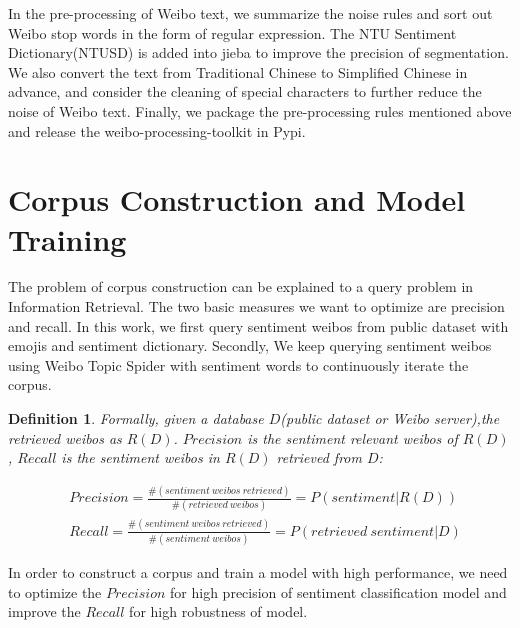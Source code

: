 \documentclass[runningheads]{llncs}
\begin{document}
In the pre-processing of Weibo text, we summarize the noise rules and sort out Weibo stop words in the form of regular expression. The NTU Sentiment Dictionary(NTUSD) \cite{ku2006opinion} is added into jieba to improve the precision of segmentation. We also convert the text from Traditional Chinese to Simplified Chinese in advance, and consider the cleaning of special characters to further reduce the noise of Weibo text. Finally, we package the pre-processing rules mentioned above and release the weibo-processing-toolkit in Pypi. 

\section{Corpus Construction and Model Training}

The problem of corpus construction can be explained to a query problem in Information Retrieval. The two basic measures we want to optimize are precision and recall. In this work, we first query sentiment weibos from public dataset with emojis and sentiment dictionary. Secondly, We keep querying sentiment weibos using Weibo Topic Spider with sentiment words to continuously iterate the corpus.

\newtheorem{myDef}{Definition}

\begin{myDef}
Formally, given a database $D$(public dataset or Weibo server),the retrieved weibos as $R(D)$.  $Precision$ is the sentiment relevant weibos of $R(D)$, $Recall$ is the sentiment weibos in $R(D)$ retrieved from $D$:

\scriptsize{ %
\begin{align}
&Precision = \frac{\#\left ( sentiment\ weibos\ retrieved \right )}{\#\left ( retrieved\ weibos \right )} = P\left ( sentiment | R(D) \right ) \\
&Recall = \frac{\#\left ( sentiment\ weibos\ retrieved \right )}{\#\left ( sentiment\ weibos \right )} = P\left (retrieved\ sentiment | D\right )
\end{align}
} %
\end{myDef}

In order to construct a corpus and train a model with high performance, we need to optimize the $Precision$ for high precision of sentiment classification model and improve the $Recall$ for high robustness of model.
\end{document}
